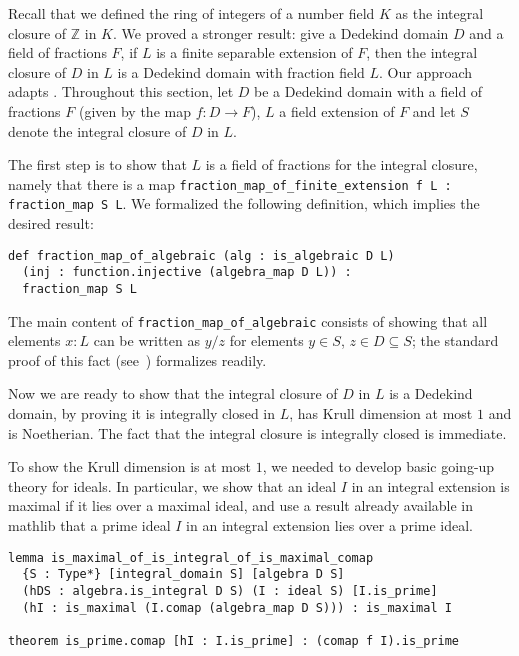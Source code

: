 \documentclass[a4paper,USenglish,cleveref, autoref, thm-restate]{lipics-v2021}
\newcommand{\lean}[1]{\texttt{#1}\xspace} %
\newcommand{\mathlib}{\textsf{mathlib}\xspace}
\newcommand{\Z}{\mathbb{Z}}
\begin{document}
Recall that we defined the ring of integers of a number field $K$ as the integral closure of $\Z$ in $K$.
We proved a stronger result: give a Dedekind domain $D$ and a field of fractions $F$, if $L$ is a finite separable extension of $F$, then the integral closure of $D$ in $L$ is a Dedekind domain with fraction field $L$.
Our approach adapts \cite[Theorem~3.1]{Neukirch}.
Throughout this section, let $D$ be a Dedekind domain with a field of fractions $F$ (given by the map $f \colon D \to F$), $L$ a field extension of $F$ and let $S$ denote the integral closure of $D$ in $L$.

The first step is to show that $L$ is a field of fractions for the integral closure, namely that there is a map \lean{fraction\_map\_of\_finite\_extension f L : fraction\_map S L}.
We formalized the following definition, which implies the desired result:
\begin{lstlisting}
def fraction_map_of_algebraic (alg : is_algebraic D L)
  (inj : function.injective (algebra_map D L)) :
  fraction_map S L
\end{lstlisting}
The main content of \lean{fraction\_map\_of\_algebraic} consists of showing that all elements $x : L$ can be written as $y / z$ for elements $y \in S$, $z \in D \subseteq S$;
the standard proof of this fact (see~\cite[Theorem~15.29]{Dummit-and-Foote}) formalizes readily.

Now we are ready to show that the integral closure of $D$ in $L$ is a Dedekind domain,
by proving it is integrally closed in $L$, has Krull dimension at most $1$ and is Noetherian.
The fact that the integral closure is integrally closed is immediate.

To show the Krull dimension is at most $1$, we needed to develop basic going-up theory for ideals.
In particular, we show that an ideal $I$ in an integral extension is maximal if it lies over a maximal ideal,
and use a result already available in \mathlib that a prime ideal $I$ in an integral extension lies over a prime ideal.
\begin{lstlisting}
lemma is_maximal_of_is_integral_of_is_maximal_comap
  {S : Type*} [integral_domain S] [algebra D S]
  (hDS : algebra.is_integral D S) (I : ideal S) [I.is_prime]
  (hI : is_maximal (I.comap (algebra_map D S))) : is_maximal I

theorem is_prime.comap [hI : I.is_prime] : (comap f I).is_prime
\end{lstlisting}
\end{document}
